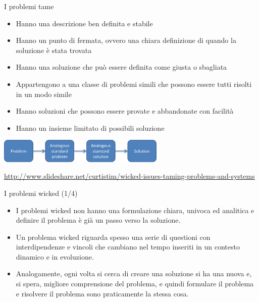 \documentclass{beamer}
\begin{document}
\begin{frame}{\centerline{I problemi tame}}

\begin{itemize}
\item Hanno una descrizione ben definita e stabile
\item Hanno un punto di fermata, ovvero una chiara definizione di quando la soluzione \`{e} stata trovata
\item Hanno una soluzione che pu\`{o} essere definita come giusta o sbagliata
\item Appartengono a una classe di problemi simili che possono essere tutti risolti in un modo simile
\item Hanno soluzioni che possono essere provate e abbandonate con facilit\`{a}
\item Hanno un insieme limitato di possibili soluzione
\end{itemize}
\begin{center}
\includegraphics[width=80mm]{P2023.AIBCCSS.IlConcettoDiSoftware/pic-04.png}
\end{center}

\begin{center}
\tiny
\url{http://www.slideshare.net/curtistim/wicked-issues-taming-problems-and-systems}
\end{center}

\end{frame}


\begin{frame}{\centerline{I problemi wicked (1/4)}}

\small
\begin{itemize}
\item I problemi wicked non hanno una formulazione chiara, univoca ed analitica e definire il problema \`{e} gi\`{a} un passo verso la soluzione.

\item Un problema wicked riguarda spesso una serie di questioni con interdipendenze e vincoli che cambiano nel tempo inseriti in un contesto dinamico e in evoluzione.

\item Analogamente, ogni volta si cerca di creare una soluzione si ha una nuova e, si spera, migliore comprensione del problema, e quindi formulare il problema e risolvere il problema sono praticamente la stessa cosa.


\end{itemize}

\end{frame}
\end{document}
